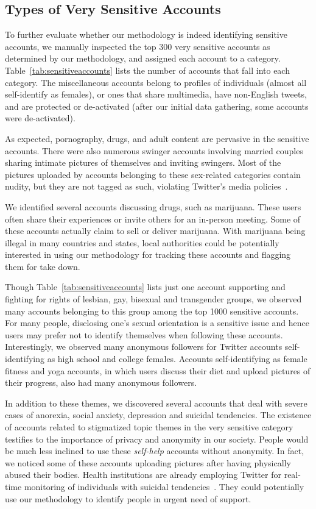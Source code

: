 \documentclass[conference]{IEEEtran}
\begin{document}
\subsection{Types of Very Sensitive Accounts}
\label{sec:sensitiveaccounttypes}

To further evaluate whether our methodology is indeed identifying sensitive accounts, we manually inspected the top 300 very sensitive accounts as determined by our methodology, and assigned each account to a category. Table~\ref{tab:sensitiveaccounts} lists the number of accounts that fall into each category. The miscellaneous accounts belong to profiles of individuals (almost all self-identify as females), or ones that share multimedia, have non-English tweets, and are protected or de-activated (after our initial data gathering, some accounts were de-activated). 

As expected, pornography, drugs, and adult content are pervasive in the sensitive accounts. There were also numerous  swinger accounts involving married couples sharing intimate pictures of themselves and inviting swingers. 
Most of the pictures uploaded by accounts belonging to these sex-related categories contain nudity, but they are not tagged as such, violating Twitter's media policies~\cite{twittermediapolicy}. 

We identified several accounts discussing drugs, such as marijuana. These users often share their experiences or invite others for an in-person meeting. Some of these accounts actually claim to sell or deliver marijuana. With marijuana being illegal in many countries and states, local authorities could be potentially interested in using our methodology for tracking these accounts and flagging them for take down. 

Though Table~\ref{tab:sensitiveaccounts} lists just one account supporting and fighting for rights of lesbian, gay, bisexual and transgender groups, we observed many accounts belonging to this group among the top 1000 sensitive accounts. For many people, disclosing one's sexual orientation is a sensitive issue and hence users may prefer not to identify themselves when following these accounts. Interestingly, we observed many anonymous followers for Twitter accounts self-identifying as high school and college females. 
Accounts self-identifying as female fitness and yoga accounts, in which users discuss their diet and upload pictures of their progress, also had many anonymous followers. 

In addition to these themes, we discovered several accounts that deal with severe cases of anorexia, social anxiety, depression and suicidal tendencies. 
The existence of accounts related to stigmatized topic themes in the very sensitive category testifies to the importance of privacy and anonymity in our society. 
People would be much less inclined to use these \textit{self-help} accounts without anonymity. In fact, we noticed some of these accounts uploading pictures after having physically abused their bodies. 
Health institutions are already employing Twitter for real-time monitoring of individuals with suicidal tendencies~\cite{twittersuicidetracking}. They could potentially use our methodology to identify people in urgent need of support.
\end{document}
